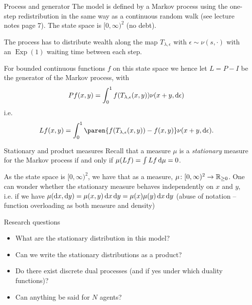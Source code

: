 \documentclass[9pt, handout]{beamer}
\begin{document}
\begin{frame}{Process and generator}
The model is defined by a Markov process using the one-step redistribution in the same way as a continuous random walk (see lecture notes page 7). The state space is $[0, \infty)^2$ (no debt).

The process has to distribute wealth along the map $T_{\lambda, \epsilon}$ with $\epsilon \sim \nu(s, \cdot)$ with an $\operatorname*{Exp}(1)$ waiting time between each step.

For bounded continuous functions $f$ on this state space we hence let $L = P - I$ be the generator of the Markov process, with
\[
Pf(x, y) = \int_0^1 f(T_{\lambda, \epsilon}(x, y)) \nu(x+y, \mathop{}\!\mathrm{d} \epsilon)
\]
\pause
i.e.
\[
Lf(x, y) = \int_0^1 \paren{f(T_{\lambda, \epsilon}(x, y)) - f(x, y) } \nu(x+y, \diff \epsilon).
\]
\end{frame}



\begin{frame}{Stationary and product measures}
Recall that a measure $\mu$ is a \emph{stationary} measure for the Markov process if and only if $\mu(Lf) = \int Lf \mathop{}\!\mathrm{d} \mu = 0$.

\pause

As the state space is $[0, \infty)^2$, we have that as a measure, $\mu\colon [0, \infty)^2 \to \mathbb{R}_{\ge 0}$. One can wonder whether the stationary measure behaves independently on $x$ and $y$, i.e. if we have $\mu(\mathop{}\!\mathrm{d} x, \mathop{}\!\mathrm{d} y) = \mu(x, y) \mathop{}\!\mathrm{d} x \mathop{}\!\mathrm{d} y = \mu(x) \mu(y) \mathop{}\!\mathrm{d} x \mathop{}\!\mathrm{d} y$ (abuse of notation -- function overloading as both measure and density)
\end{frame}



\begin{frame}{Research questions}
\begin{itemize}
\item What are the stationary distribution in this model?
\item Can we write the stationary distributions as a product?
\item Do there exist discrete dual processes (and if yes under which duality functions)?
\item Can anything be said for $N$ agents?
\end{itemize}
\end{frame}
\end{document}

